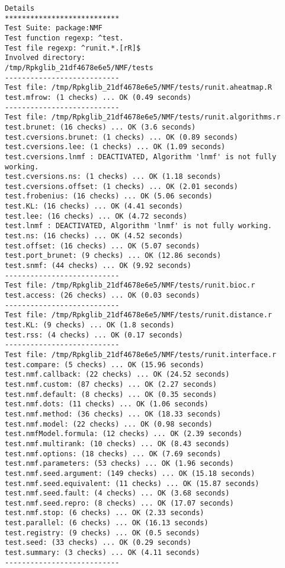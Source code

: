 \documentclass[10pt]{article}\usepackage[]{graphicx}\usepackage[]{color}
\begin{document}
\begin{verbatim}
Details 
*************************** 
Test Suite: package:NMF 
Test function regexp: ^test. 
Test file regexp: ^runit.*.[rR]$ 
Involved directory: 
/tmp/Rpkglib_21df4678e6e5/NMF/tests 
--------------------------- 
Test file: /tmp/Rpkglib_21df4678e6e5/NMF/tests/runit.aheatmap.R 
test.mfrow: (1 checks) ... OK (0.49 seconds)
--------------------------- 
Test file: /tmp/Rpkglib_21df4678e6e5/NMF/tests/runit.algorithms.r 
test.brunet: (16 checks) ... OK (3.6 seconds)
test.cversions.brunet: (1 checks) ... OK (0.89 seconds)
test.cversions.lee: (1 checks) ... OK (1.09 seconds)
test.cversions.lnmf : DEACTIVATED, Algorithm 'lnmf' is not fully working.
test.cversions.ns: (1 checks) ... OK (1.18 seconds)
test.cversions.offset: (1 checks) ... OK (2.01 seconds)
test.frobenius: (16 checks) ... OK (5.06 seconds)
test.KL: (16 checks) ... OK (4.41 seconds)
test.lee: (16 checks) ... OK (4.72 seconds)
test.lnmf : DEACTIVATED, Algorithm 'lnmf' is not fully working.
test.ns: (16 checks) ... OK (4.52 seconds)
test.offset: (16 checks) ... OK (5.07 seconds)
test.port_brunet: (9 checks) ... OK (12.86 seconds)
test.snmf: (44 checks) ... OK (9.92 seconds)
--------------------------- 
Test file: /tmp/Rpkglib_21df4678e6e5/NMF/tests/runit.bioc.r 
test.access: (26 checks) ... OK (0.03 seconds)
--------------------------- 
Test file: /tmp/Rpkglib_21df4678e6e5/NMF/tests/runit.distance.r 
test.KL: (9 checks) ... OK (1.8 seconds)
test.rss: (4 checks) ... OK (0.17 seconds)
--------------------------- 
Test file: /tmp/Rpkglib_21df4678e6e5/NMF/tests/runit.interface.r 
test.compare: (5 checks) ... OK (15.96 seconds)
test.nmf.callback: (22 checks) ... OK (24.52 seconds)
test.nmf.custom: (87 checks) ... OK (2.27 seconds)
test.nmf.default: (8 checks) ... OK (0.35 seconds)
test.nmf.dots: (11 checks) ... OK (1.06 seconds)
test.nmf.method: (36 checks) ... OK (18.33 seconds)
test.nmf.model: (22 checks) ... OK (0.98 seconds)
test.nmfModel.formula: (12 checks) ... OK (2.39 seconds)
test.nmf.multirank: (10 checks) ... OK (8.43 seconds)
test.nmf.options: (18 checks) ... OK (7.69 seconds)
test.nmf.parameters: (53 checks) ... OK (1.96 seconds)
test.nmf.seed.argument: (149 checks) ... OK (15.18 seconds)
test.nmf.seed.equivalent: (11 checks) ... OK (15.87 seconds)
test.nmf.seed.fault: (4 checks) ... OK (3.68 seconds)
test.nmf.seed.repro: (8 checks) ... OK (17.07 seconds)
test.nmf.stop: (6 checks) ... OK (2.33 seconds)
test.parallel: (6 checks) ... OK (16.13 seconds)
test.registry: (9 checks) ... OK (0.5 seconds)
test.seed: (33 checks) ... OK (0.29 seconds)
test.summary: (3 checks) ... OK (4.11 seconds)
--------------------------- 

\end{verbatim}
\end{document}

